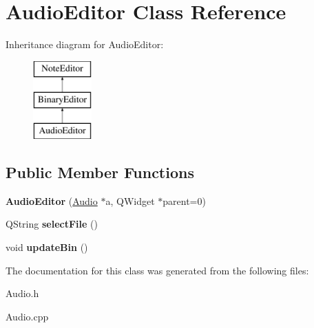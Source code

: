 \hypertarget{classAudioEditor}{\section{\-Audio\-Editor \-Class \-Reference}
\label{classAudioEditor}
}
\-Inheritance diagram for \-Audio\-Editor\-:\begin{figure}[H]
\begin{center}
\leavevmode
\includegraphics[height=3.000000cm]{classAudioEditor}
\end{center}
\end{figure}
\subsection*{\-Public \-Member \-Functions}
\begin{DoxyCompactItemize}
\item 
\hypertarget{classAudioEditor_acd534b15b2ce58480b0479439e7dd3be}{{\bfseries \-Audio\-Editor} (\hyperlink{classAudio}{\-Audio} $\ast$a, \-Q\-Widget $\ast$parent=0)}\label{classAudioEditor_acd534b15b2ce58480b0479439e7dd3be}

\item 
\hypertarget{classAudioEditor_a03ab5938411b0b8085cd9fc67a77da7b}{\-Q\-String {\bfseries select\-File} ()}\label{classAudioEditor_a03ab5938411b0b8085cd9fc67a77da7b}

\item 
\hypertarget{classAudioEditor_a789f71d54c019cf977e7295dbd647b29}{void {\bfseries update\-Bin} ()}\label{classAudioEditor_a789f71d54c019cf977e7295dbd647b29}

\end{DoxyCompactItemize}


\-The documentation for this class was generated from the following files\-:\begin{DoxyCompactItemize}
\item 
\-Audio.\-h\item 
\-Audio.\-cpp\end{DoxyCompactItemize}
